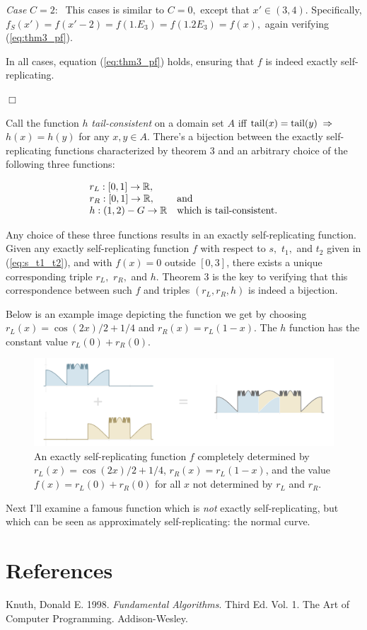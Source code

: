 \documentclass[20pt,]{extarticle}
\begin{document}
\emph{Case} \(C=2:\;\) This cases is similar to \(C=0,\) except that
\(x' \in (3,4).\) Specifically,
\(f_S(x') = f(x'-2) = f(1.E_3) = f(1.2E_3) = f(x),\) again verifying
(\ref{eq:thm3_pf}).

In all cases, equation (\ref{eq:thm3_pf}) holds, ensuring that \(f\) is
indeed exactly self-replicating.

\hfill\(\Box\)

Call the function \(h\) \emph{tail-consistent} on a domain set \(A\) iff
\(\text{tail}(x) = \text{tail}(y) \;\Rightarrow\;\) \(h(x) = h(y)\) for any
\(x,y \in A.\) There's a bijection between the exactly self-replicating
functions characterized by theorem 3 and an arbitrary choice of the
following three functions:

\[\begin{array}{ll}
r_L : [0,1] \to \mathbb{R}, \\
r_R : [0,1] \to \mathbb{R}, & \text{and} \\
h   : (1,2) - G \to \mathbb{R} & \text{which is tail-consistent.}
\end{array}\]

Any choice of these three functions results in an exactly
self-replicating function. Given any exactly self-replicating function
\(f\) with respect to \(s,\) \(t_1,\) and \(t_2\) given in
(\ref{eq:s_t1_t2}), and with \(f(x) = 0\) outside \([0,3]\), there
exists a unique corresponding triple \(r_L,\) \(r_R,\) and \(h\).
Theorem 3 is the key to verifying that this correspondence between such
\(f\) and triples \((r_L, r_R, h)\) is indeed a bijection.

Below is an example image depicting the function we get by choosing
\(r_L(x) = \cos(2x)/2 + 1/4\) and \(r_R(x) = r_L(1-x)\). The \(h\)
function has the constant value \(r_L(0) + r_R(0)\).

\begin{figure}
\centering
\includegraphics{images/nonplateau.png}
\caption{An exactly self-replicating function \(f\) completely
determined by \(r_L(x) = \cos(2x)/2 + 1/4\), \(r_R(x) = r_L(1 - x)\),
and the value \(f(x) = r_L(0) + r_R(0)\) for all \(x\) not determined by
\(r_L\) and \(r_R\).}\label{fig:nonplateau}
\end{figure}

Next I'll examine a famous function which is \emph{not} exactly
self-replicating, but which can be seen as approximately
self-replicating: the normal curve.

\section*{References}\label{references}

\hypertarget{refs}{}
\hypertarget{ref-taocp1}{}
Knuth, Donald E. 1998. \emph{Fundamental Algorithms}. Third Ed. Vol. 1.
The Art of Computer Programming. Addison-Wesley.
\end{document}
